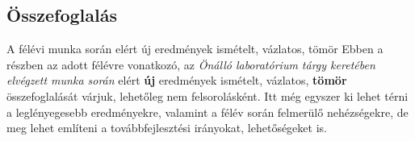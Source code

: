 \documentclass[a4paper,oneside]{article}
\begin{document}
%
%
%
%
%

\subsection{Összefoglalás}
\label{sec:osszefoglalas}

A félévi munka során elért új eredmények ismételt, vázlatos, tömör
Ebben a részben az adott félévre vonatkozó, az \emph{Önálló
  laboratórium tárgy keretében elvégzett munka során} elért
\textbf{új} eredmények ismételt, vázlatos, \textbf{tömör}
összefoglalását várjuk, lehetőleg nem felsorolásként.  Itt még egyszer
ki lehet térni a leglényegesebb eredményekre, valamint a félév során
felmerülő nehézségekre, de meg lehet említeni a továbbfejlesztési
irányokat, lehetőségeket is.
\end{document}
